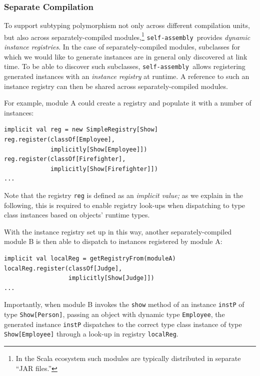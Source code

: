 \documentclass[preprint]{sigplanconf}
\newcommand{\selfassembly}{\texttt{self-assembly~}}
\begin{document}


\subsubsection{Separate Compilation}

To support subtyping polymorphism not only across different compilation units,
but also across separately-compiled modules,\footnote{In the Scala ecosystem
such modules are typically distributed in separate ``JAR files.''}
\selfassembly provides \emph{dynamic instance registries}. In the case of
separately-compiled modules, subclasses for which we would like to generate
instances are in general only discovered at link time. To be able to discover
such subclasses, \selfassembly allows registering generated instances
with an \emph{instance registry} at runtime. A reference to such an
instance registry can then be shared across separately-compiled modules.

For example, module A could create a registry and populate it with a number of
instances:
\begin{lstlisting}
implicit val reg = new SimpleRegistry[Show]
reg.register(classOf[Employee],
             implicitly[Show[Employee]])
reg.register(classOf[Firefighter],
             implicitly[Show[Firefighter]])
...
\end{lstlisting}
\noindent
Note that the registry \verb|reg| is defined as an \emph{implicit value;} as we
explain in the following, this is required to enable registry look-ups when
dispatching to type class instances based on objects' runtime types.

With the instance registry set up in this way, another separately-compiled
module B is then able to dispatch to instances registered by module A:

\begin{lstlisting}
implicit val localReg = getRegistryFrom(moduleA)
localReg.register(classOf[Judge],
                  implicitly[Show[Judge]])
...
\end{lstlisting}
\noindent
Importantly, when module B invokes the \verb|show| method of an instance
\verb|instP| of type \verb|Show[Person]|, passing an object with dynamic type
\verb|Employee|, the generated instance \verb|instP| dispatches to the correct
type class instance of type \verb|Show[Employee]| through a look-up in
registry \verb|localReg|.
\end{document}
